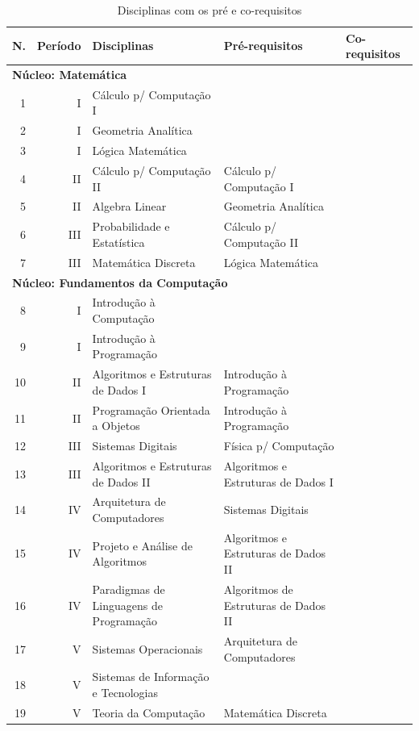 \documentclass[
	12pt,				%
	openright,			%
  oneside,     %
	a4paper,			%
	english,			%
	french,				%
	spanish,			%
	brazil				%
	]{abntex2}
\begin{document}
\begin{apendicesenv}
\begin{landscape}
    \begin{longtable}{r|r|l|l|l}
     \caption{Disciplinas com os pré e co-requisitos}
     \label{ltab:PreReq}
     \\
     \hline
    \textbf{N.} & \textbf{Período} & \textbf{Disciplinas} & \textbf{Pré-requisitos} & \textbf{Co-requisitos} \\
\hline
\multicolumn{5}{l}{\textbf{Núcleo: Matemática}}\\ \hline
    1     & I     & Cálculo p/ Computação I &       &       \\ \hline
    2     & I     & Geometria Analítica &       &        \\ \hline
    3     & I     & Lógica Matemática &       &        \\ \hline
    4     & II    & Cálculo p/ Computação II & Cálculo p/ Computação I &       \\ \hline
    5     & II    & Algebra Linear & Geometria Analítica &        \\ \hline
    6     & III   & Probabilidade e Estatística & Cálculo p/ Computação II &       \\ \hline
    7     & III   & Matemática Discreta & Lógica Matemática &        \\ \hline

\multicolumn{5}{l}{\textbf{Núcleo: Fundamentos da Computação}}\\ \hline
    8     & I     & Introdução à Computação &       &        \\ \hline
    9     & I     & Introdução à Programação &       &      \\ \hline
    10    & II    & Algoritmos e Estruturas de Dados I & Introdução à Programação &       \\ \hline
    11    & II    & Programação Orientada a Objetos & Introdução à Programação &       \\ \hline
    12    & III   & Sistemas Digitais & Física p/ Computação &       \\ \hline
    13    & III   & Algoritmos e Estruturas de Dados II & Algoritmos e Estruturas de Dados I &       \\ \hline
    14    & IV    & Arquitetura de Computadores & Sistemas Digitais &       \\ \hline
    15    & IV    & Projeto e Análise de Algoritmos & Algoritmos e Estruturas de Dados II &       \\ \hline
    16    & IV    & Paradigmas de Linguagens de Programação & Algoritmos de Estruturas de Dados II &       \\ \hline
    17    & V     & Sistemas Operacionais & Arquitetura de Computadores &       \\ \hline
    18    & V     & Sistemas de Informação e Tecnologias &       &       \\ \hline
    19    & V     & Teoria da Computação & Matemática Discreta &        \\ \hline


\end{longtable}
\end{landscape}
\end{apendicesenv}
\end{document}
